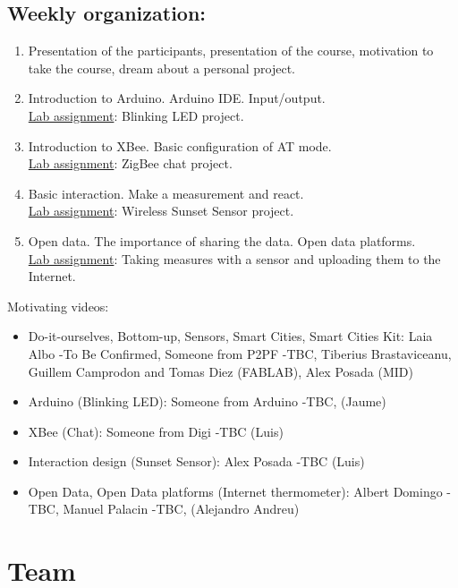 \documentclass{tufte-book} %
\begin{document}
\section{Weekly organization:}
\begin{enumerate}
\item Presentation of the participants, presentation of the course, motivation to take the course, dream about a personal project.
\item Introduction to Arduino. Arduino IDE. Input/output. \\\underline{Lab assignment}: Blinking LED project.
\item Introduction to XBee. Basic configuration of AT mode. \\\underline{Lab assignment}: ZigBee chat project.
\item Basic interaction. Make a measurement and react. \\\underline{Lab assignment}: Wireless Sunset Sensor project.
\item Open data. The importance of sharing the data. Open data platforms. \\\underline{Lab assignment}: Taking measures with a sensor and uploading them to the Internet.
\end{enumerate}

Motivating videos:
\begin{itemize}
\item Do-it-ourselves, Bottom-up, Sensors, Smart Cities, Smart Cities Kit:
Laia Albo -To Be Confirmed, Someone from P2PF -TBC, Tiberius Brastaviceanu, Guillem Camprodon and Tomas Diez (FABLAB), Alex Posada (MID)

\item Arduino (Blinking LED):
Someone from Arduino -TBC, (Jaume)

\item XBee (Chat):
Someone from Digi -TBC (Luis)

\item Interaction design (Sunset Sensor):
Alex Posada -TBC (Luis)

\item Open Data, Open Data platforms (Internet thermometer):
Albert Domingo -TBC, Manuel Palacin -TBC, (Alejandro Andreu)
\end{itemize}



\chapter{Team}
\end{document}
